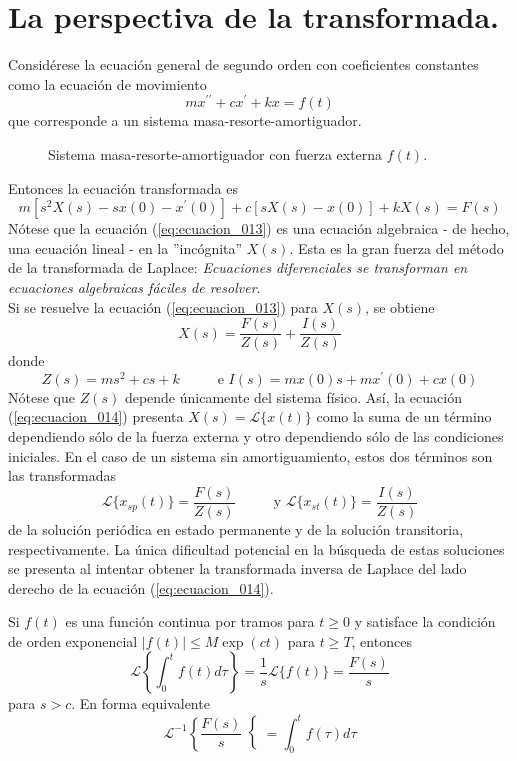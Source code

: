 \section*{La perspectiva de la transformada.}
Considérese la ecuación general de segundo orden con coeficientes constantes como la ecuación de movimiento
\[ m x^{\prime \prime} + c x^{\prime} + k x =  f(t) \]
que corresponde a un sistema masa-resorte-amortiguador.
\begin{figure}[H]
\centering

\label{fig:figura_007}
\caption{Sistema masa-resorte-amortiguador con fuerza externa $f(t)$.}
\end{figure}
Entonces la ecuación transformada es
\begin{equation}
m [s^{2} X(s) - s x(0) - x^{\prime}(0) ] + c [ s X(s) - x(0) ] + k X(s) = F(s)
\label{eq:ecuacion_013}
\end{equation}
Nótese que la ecuación (\ref{eq:ecuacion_013}) es una ecuación algebraica  - de hecho, una ecuación lineal - en la ''incógnita'' $X(s)$. Esta es la gran fuerza del método de la transformada de Laplace: \emph{Ecuaciones diferenciales se transforman en ecuaciones algebraicas fáciles de resolver}.
\\
Si se resuelve la ecuación (\ref{eq:ecuacion_013}) para $X(s)$, se obtiene
\begin{equation}
X(s) = \dfrac{F(s)}{Z(s)} + \dfrac{I(s)}{Z(s)}
\label{eq:ecuacion_014}
\end{equation}
donde
\[ Z(s) = ms^{2} + cs + k \hspace{1cm} \mbox{ e }  I(s) = m x(0) s + m x^{\prime} (0) + c x(0) \]
Nótese que $Z(s)$ depende únicamente del sistema físico. Así, la ecuación (\ref{eq:ecuacion_014}) presenta $X(s)= \mathscr{L} \{ x(t)\}$ como la suma de un término dependiendo sólo de la fuerza externa y otro dependiendo sólo de las condiciones iniciales. En el caso de un sistema sin amortiguamiento, estos dos términos son las transformadas
\[ \mathscr{L} \{ x_{sp} (t) \} = \dfrac{F(s)}{Z(s)} \hspace{1cm} \mbox{ y } \mathscr{L} \{ x_{st} (t) \} = \dfrac{I(s)}{Z(s)} \]
de la solución periódica en estado permanente y de la solución transitoria, respectivamente. La única dificultad potencial en la búsqueda de estas soluciones se presenta al intentar obtener la transformada inversa de Laplace del lado derecho de la ecuación (\ref{eq:ecuacion_014}). 
\begin{teo}
Si $f(t)$ es una función continua por tramos para $t \geq 0$ y satisface la condición de orden exponencial $\vert f(t) \vert \leq M \exp(ct)$ para $t \geq T $, entonces
\begin{equation}
\mathscr{L} \left\lbrace \int_{0}^{t} f(t) d \tau \right\rbrace = \dfrac{1}{s} \mathscr{L} \{ f(t) \} = \dfrac{F(s)}{s}
\label{eq:ecuacion_017}
\end{equation}
para $s > c$. En forma equivalente 
\begin{equation}
\mathscr{L}^{-1} \left\lbrace \dfrac{F(s)}{s}  \right\lbrace = \int_{0}^{t} f(\tau) d \tau
\label{eq:ecuacion_018}
\end{equation} 
\end{teo}

